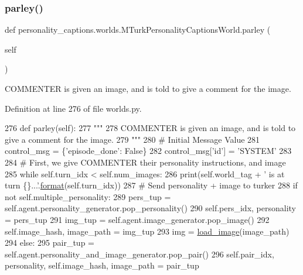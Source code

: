 \subsubsection{\texorpdfstring{parley()}{parley()}}
{\footnotesize\ttfamily def personality\+\_\+captions.\+worlds.\+M\+Turk\+Personality\+Captions\+World.\+parley (\begin{DoxyParamCaption}\item[{}]{self }\end{DoxyParamCaption})}

\begin{DoxyVerb}COMMENTER is given an image, and is told to give a comment for the image.
\end{DoxyVerb}
 

Definition at line 276 of file worlds.\+py.


\begin{DoxyCode}
276     \textcolor{keyword}{def }parley(self):
277         \textcolor{stringliteral}{"""}
278 \textcolor{stringliteral}{        COMMENTER is given an image, and is told to give a comment for the image.}
279 \textcolor{stringliteral}{        """}
280         \textcolor{comment}{# Initial Message Value}
281         control\_msg = \{\textcolor{stringliteral}{'episode\_done'}: \textcolor{keyword}{False}\}
282         control\_msg[\textcolor{stringliteral}{'id'}] = \textcolor{stringliteral}{'SYSTEM'}
283 
284         \textcolor{comment}{# First, we give COMMENTER their personality instructions, and image}
285         \textcolor{keywordflow}{while} self.turn\_idx < self.num\_images:
286             print(self.world\_tag + \textcolor{stringliteral}{' is at turn \{\}...'}.\hyperlink{namespaceparlai_1_1chat__service_1_1services_1_1messenger_1_1shared__utils_a32e2e2022b824fbaf80c747160b52a76}{format}(self.turn\_idx))
287             \textcolor{comment}{# Send personality + image to turker}
288             \textcolor{keywordflow}{if} \textcolor{keywordflow}{not} self.multiple\_personality:
289                 pers\_tup = self.agent.personality\_generator.pop\_personality()
290                 self.pers\_idx, personality = pers\_tup
291                 img\_tup = self.agent.image\_generator.pop\_image()
292                 self.image\_hash, image\_path = img\_tup
293                 img = \hyperlink{namespacepersonality__captions_1_1worlds_a2863737d97a8e8c5a1ebe9029d0d2293}{load\_image}(image\_path)
294             \textcolor{keywordflow}{else}:
295                 pair\_tup = self.agent.personality\_and\_image\_generator.pop\_pair()
296                 self.pair\_idx, personality, self.image\_hash, image\_path = pair\_tup

\end{DoxyCode}
